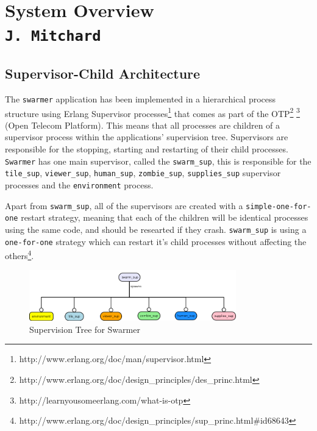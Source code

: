 \pagestyle{empty}
\section{System Overview\\{\small\tt J.~Mitchard}}

\subsection{Supervisor-Child Architecture}
The \verb+swarmer+ application has been implemented in a hierarchical process structure using Erlang Supervisor processes\footnote{http://www.erlang.org/doc/man/supervisor.html} that comes as part of the OTP\footnote{http://www.erlang.org/doc/design\_principles/des\_princ.html} \footnote{http://learnyousomeerlang.com/what-is-otp} (Open Telecom Platform). This means that all processes are children of a supervisor process within the applications' supervision tree. Supervisors are responsible for the stopping, starting and restarting of their child processes.
%
\verb+Swarmer+ has one main supervisor, called the \verb+swarm_sup+, this is responsible for the \verb+tile_sup+, \verb+viewer_sup+, \verb+human_sup+, \verb+zombie_sup+, \verb+supplies_sup+ supervisor processes and the \verb+environment+ process.

Apart from \verb+swarm_sup+, all of the supervisors are created with a \verb+simple-one-for-one+ restart strategy, meaning that each of the children will be identical processes using the same code, and should be researted if they crash. \verb+swarm_sup+ is using a \verb+one-for-one+ strategy which can restart it's child processes without affecting the others\footnote{http://www.erlang.org/doc/design\_principles/sup\_princ.html\#id68643}.

\begin{figure}[h]
  \centering
  \includegraphics[width=0.8\textwidth]{img/supervisor.png}
\caption{Supervision Tree for Swarmer}
    \label{fig:sup_tree}
\end{figure}


